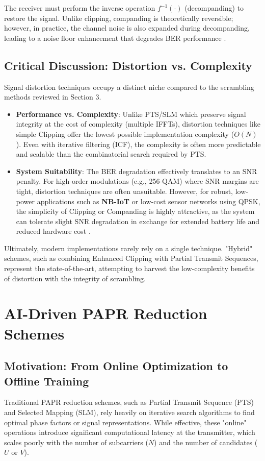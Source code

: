 \documentclass[12pt, a4paper, onecolumn]{article}
\begin{document}
The receiver must perform the inverse operation $f^{-1}(\cdot)$ (decompanding) to restore the signal. Unlike clipping, companding is theoretically reversible; however, in practice, the channel noise is also expanded during decompanding, leading to a noise floor enhancement that degrades BER performance \cite{ref11}.

\subsection{Critical Discussion: Distortion vs. Complexity}
Signal distortion techniques occupy a distinct niche compared to the scrambling methods reviewed in Section 3.

\begin{itemize}
    \item \textbf{Performance vs. Complexity}: Unlike PTS/SLM which preserve signal integrity at the cost of complexity (multiple IFFTs), distortion techniques like simple Clipping offer the lowest possible implementation complexity ($O(N)$). Even with iterative filtering (ICF), the complexity is often more predictable and scalable than the combinatorial search required by PTS.
    \item \textbf{System Suitability}: The BER degradation effectively translates to an SNR penalty. For high-order modulations (e.g., 256-QAM) where SNR margins are tight, distortion techniques are often unsuitable. However, for robust, low-power applications such as \textbf{NB-IoT} or low-cost sensor networks using QPSK, the simplicity of Clipping or Companding is highly attractive, as the system can tolerate slight SNR degradation in exchange for extended battery life and reduced hardware cost \cite{ref12}.
\end{itemize}

Ultimately, modern implementations rarely rely on a single technique. "Hybrid" schemes, such as combining Enhanced Clipping with Partial Transmit Sequences, represent the state-of-the-art, attempting to harvest the low-complexity benefits of distortion with the integrity of scrambling.

\section{AI-Driven PAPR Reduction Schemes}

\subsection{Motivation: From Online Optimization to Offline Training}
Traditional PAPR reduction schemes, such as Partial Transmit Sequence (PTS) and Selected Mapping (SLM), rely heavily on iterative search algorithms to find optimal phase factors or signal representations. While effective, these "online" operations introduce significant computational latency at the transmitter, which scales poorly with the number of subcarriers ($N$) and the number of candidates ($U$ or $V$).
\end{document}
